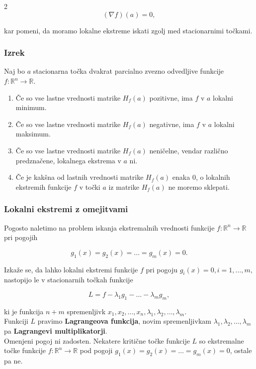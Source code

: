 \documentclass{article}
\begin{document}
\begin{multicols}{2}
	\[ (\nabla f)(a) = 0, \]

	kar pomeni, da moramo lokalne ekstreme iskati zgolj med stacionarnimi točkami.

	\subsubsection{Izrek}
	Naj bo \( a \) stacionarna točka dvakrat parcialno zvezno odvedljive funkcije \( f: \mathbb{R}^n \rightarrow \mathbb{R} \).

	\begin{enumerate}
		\item Če so vse lastne vrednosti matrike \( H_f(a) \) pozitivne, ima \( f \) v \( a \) lokalni minimum.
		\item Če so vse lastne vrednosti matrike \( H_f(a) \) negativne, ima \( f \) v \( a \) lokalni maksimum.
		\item Če so vse lastne vrednosti matrike \( H_f(a) \) neničelne, vendar različno predznačene, lokalnega ekstrema v \( a \) ni.
		\item Če je kakšna od lastnih vrednosti matrike \( H_f(a) \) enaka 0, o lokalnih ekstremih funkcije \( f \) v točki \( a \) iz matrike \( H_f(a) \) ne moremo sklepati.
	\end{enumerate}


	\subsubsection{Lokalni ekstremi z omejitvami}

	Pogosto naletimo na problem iskanja ekstremalnih vrednosti funkcije \( f: \mathbb{R}^n \rightarrow \mathbb{R} \) pri pogojih

	\[ g_1(x) = g_2(x) = \ldots = g_m(x) = 0. \]

	Izkaže se, da lahko lokalni ekstremi funkcije \( f \) pri pogoju \( g_i(x) = 0, i = 1, \ldots, m, \) nastopijo le v stacionarnih točkah funkcije

	\[ L = f - \lambda_1 g_1 - \ldots - \lambda_m g_m, \]

	ki je funkcija \( n + m \) spremenljivk \( x_1, x_2, \ldots, x_n, \lambda_1, \lambda_2, \ldots, \lambda_m \).\\
	Funkciji \( L \) pravimo \textbf{Lagrangeova funkcija}, novim spremenljivkam \( \lambda_1, \lambda_2, \ldots, \lambda_m \) pa \textbf{Lagrangevi multiplikatorji}.\\
	Omenjeni pogoj ni zadosten. Nekatere kritične točke funkcije \( L \) so ekstremalne točke funkcije \( f: \mathbb{R}^n \rightarrow \mathbb{R} \) pod pogoji \( g_1(x) = g_2(x) = \ldots = g_m(x) = 0 \), ostale pa ne.



\end{multicols}
\end{document}
